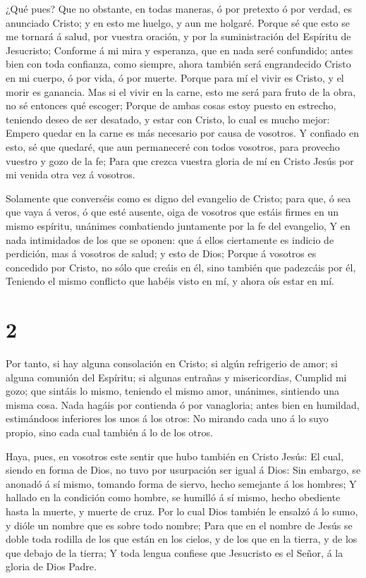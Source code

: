  ¿Qué pues? Que no obstante, en todas maneras, ó por
pretexto ó por verdad, es anunciado Cristo; y en esto me huelgo, y aun
me holgaré.  Porque sé que esto se me tornará á salud, por
vuestra oración, y por la suministración del Espíritu de Jesucristo;
 Conforme á mi mira y esperanza, que en nada seré
confundido; antes bien con toda confianza, como siempre, ahora también
será engrandecido Cristo en mi cuerpo, ó por vida, ó por muerte.
 Porque para mí el vivir es Cristo, y el morir es ganancia.
 Mas si el vivir en la carne, esto me será para fruto de la
obra, no sé entonces qué escoger;  Porque de ambas cosas
estoy puesto en estrecho, teniendo deseo de ser desatado, y estar con
Cristo, lo cual es mucho mejor:  Empero quedar en la carne
es más necesario por causa de vosotros.  Y confiado en
esto, sé que quedaré, que aun permaneceré con todos vosotros, para
provecho vuestro y gozo de la fe;  Para que crezca vuestra
gloria de mí en Cristo Jesús por mi venida otra vez á vosotros.

 Solamente que converséis como es digno del evangelio de
Cristo; para que, ó sea que vaya á veros, ó que esté ausente, oiga de
vosotros que estáis firmes en un mismo espíritu, unánimes combatiendo
juntamente por la fe del evangelio,  Y en nada intimidados
de los que se oponen: que á ellos ciertamente es indicio de perdición,
mas á vosotros de salud; y esto de Dios;  Porque á vosotros
es concedido por Cristo, no sólo que creáis en él, sino también que
padezcáis por él,  Teniendo el mismo conflicto que habéis
visto en mí, y ahora oís estar en mí.

\hypertarget{section-1}{%
\section{2}\label{section-1}}

 Por tanto, si hay alguna consolación en Cristo; si algún
refrigerio de amor; si alguna comunión del Espíritu; si algunas entrañas
y misericordias,  Cumplid mi gozo; que sintáis lo mismo,
teniendo el mismo amor, unánimes, sintiendo una misma cosa. 
Nada hagáis por contienda ó por vanagloria; antes bien en humildad,
estimándoos inferiores los unos á los otros:  No mirando
cada uno á lo suyo propio, sino cada cual también á lo de los otros.

 Haya, pues, en vosotros este sentir que hubo también en
Cristo Jesús:  El cual, siendo en forma de Dios, no tuvo por
usurpación ser igual á Dios:  Sin embargo, se anonadó á sí
mismo, tomando forma de siervo, hecho semejante á los hombres;
 Y hallado en la condición como hombre, se humilló á sí
mismo, hecho obediente hasta la muerte, y muerte de cruz. 
Por lo cual Dios también le ensalzó á lo sumo, y dióle un nombre que es
sobre todo nombre;  Para que en el nombre de Jesús se doble
toda rodilla de los que están en los cielos, y de los que en la tierra,
y de los que debajo de la tierra;  Y toda lengua confiese
que Jesucristo es el Señor, á la gloria de Dios Padre.

